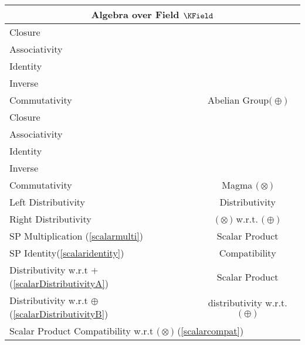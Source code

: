 \documentclass[a4paper,12pt]{scrartcl}    %
\newcommand{\OpA}{\otimes}
\newcommand{\OpB}{\oplus}
\begin{document}
\begin{minipage}[c]{0,5\textwidth}

\begin{tabular}{|l|c|} %
  \hline
  \multicolumn{2}{c}{\cellcolor{green!25}Algebra over Field $\KField$} \\
  \hline
    \cellcolor{blue!25} \footnotesize Closure& \cellcolor{yellow!25}  \\
    \cellcolor{blue!25} \footnotesize Associativity& \cellcolor{yellow!25}  \\
    \cellcolor{blue!25} \footnotesize Identity& \cellcolor{yellow!25} \\
    \cellcolor{blue!25} \footnotesize Inverse& \cellcolor{yellow!25} \\
    \cellcolor{blue!25} \footnotesize Commutativity& \multirow{-5}{*}{\tiny\cellcolor{yellow!25}Abelian Group$\big(\OpB\big)$} \\
   \hline
    \cellcolor{blue!25} \footnotesize Closure& \cellcolor{yellow!25}  \\
    \cellcolor{red!25} \footnotesize Associativity& \cellcolor{yellow!25}  \\
    \cellcolor{red!25} \footnotesize Identity& \cellcolor{yellow!25} \\
    \cellcolor{red!25} \footnotesize Inverse& \cellcolor{yellow!25} \\
    \cellcolor{red!25} \footnotesize Commutativity& \multirow{-5}{*}{\tiny\cellcolor{yellow!25} Magma $\big(\OpA\big)$} \\
  \hline
  	\cellcolor{blue!25} \footnotesize Left Distributivity&  \tiny\cellcolor{yellow!25}Distributivity\\
    \cellcolor{blue!25} \footnotesize Right Distributivity & \tiny\cellcolor{yellow!25} $\big(\OpA\big)$ w.r.t. $\big(\OpB\big)$  \\
   \hline
  \hline
     \cellcolor{blue!25} \footnotesize SP Multiplication (\ref{scalarmulti})&  \tiny\cellcolor{yellow!25}Scalar Product\\
    \cellcolor{blue!25} \footnotesize SP Identity(\ref{scalaridentity}) & \tiny\cellcolor{yellow!25} Compatibility  \\
   \hline 
    \cellcolor{blue!25} \footnotesize Distributivity w.r.t $+$ (\ref{scalarDistributivityA})&  \tiny\cellcolor{yellow!25}Scalar Product\\
    \cellcolor{blue!25} \footnotesize Distributivity w.r.t $\OpB$ (\ref{scalarDistributivityB}) & \tiny\cellcolor{yellow!25} distributivity w.r.t. $\big(\OpB\big)$  \\
   \hline
    \multicolumn{2}{l}{\footnotesize \cellcolor{blue!25} Scalar Product Compatibility w.r.t  $\big(\OpA\big)$ (\ref{scalarcompat})}\\
   \hline
\end{tabular}


\end{minipage}
\end{document}
